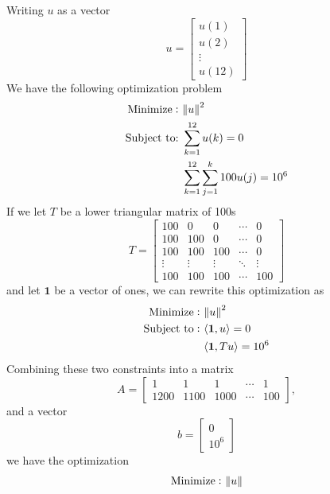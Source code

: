 \documentclass{exam}
\begin{document}
  \begin{solution} Writing $u$ as a vector
    \[
      u = 
      \begin{bmatrix}
        u(1) \\
        u(2) \\
        \vdots \\
        u(12)
      \end{bmatrix}
    \]
    We have the following optimization problem
    \[
      \begin{aligned}
        \text{Minimize}:& \ \norm{u}^2 \\
        \text{Subject to:}&\ \sum_{k=1}^{12} u(k) = 0 \\
                          &\ \sum_{k=1}^{12} \sum_{j=1}^k 100u(j) = 10^6
      \end{aligned}
    \]
    If we let $T$ be a lower triangular matrix of 100s
    \[
      T =
      \begin{bmatrix}
        100 & 0 & 0 & \cdots & 0 \\
        100 & 100 & 0 & \cdots & 0 \\
        100 & 100 & 100 & \cdots & 0 \\
        \vdots & \vdots & \vdots & \ddots & \vdots \\
        100 & 100 & 100 & \cdots & 100
      \end{bmatrix}
    \]
    and let $\mathbf{1}$ be a vector of ones, we can rewrite this optimization as
    \[
      \begin{aligned}
        \text{Minimize}:& \ \norm{u}^2 \\
        \text{Subject to}: &\ \langle \mathbf{1}, u\rangle = 0 \\
                          &\ \langle \mathbf{1}, Tu\rangle = 10^6
      \end{aligned}
    \]
    Combining these two constraints into a matrix 
    \[
      A = 
      \begin{bmatrix}
        1 & 1 & 1 & \cdots & 1 \\
        1200 & 1100 & 1000 & \cdots & 100
      \end{bmatrix},
    \]
    and a vector 
    \[
      b = 
      \begin{bmatrix}
        0 \\
        10^6
      \end{bmatrix}
    \]
    we have the optimization
    \[
      \begin{aligned}
        \text{Minimize}:& \ \norm{u} \\

\end{aligned}\]
\end{solution}
\end{document}
